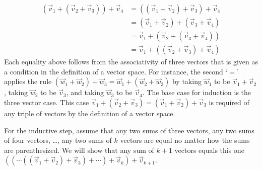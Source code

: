 \begin{exercises}
\begin{answer}
\begin{exparts}
          \begin{align*}
            (\vec{v}_1+(\vec{v}_2+\vec{v}_3))+\vec{v}_4
            &=((\vec{v}_1+\vec{v}_2)+\vec{v}_3)+\vec{v}_4  \\
            &=(\vec{v}_1+\vec{v}_2)+(\vec{v}_3+\vec{v}_4)  \\
            &=\vec{v}_1+(\vec{v}_2+(\vec{v}_3+\vec{v}_4))  \\
            &=\vec{v}_1+((\vec{v}_2+\vec{v}_3)+\vec{v}_4)
          \end{align*}
          Each equality above follows from the associativity of three vectors
          that is given as a condition in the definition of a vector space.
          For instance, the second `$=$' applies the rule
          $(\vec{w}_1+\vec{w}_2)+\vec{w}_3=\vec{w}_1+(\vec{w}_2+\vec{w}_3)$
          by taking $\vec{w}_1$ to be $\vec{v}_1+\vec{v}_2$, 
          taking $\vec{w}_2$ to be $\vec{v}_3$, 
          and taking $\vec{w}_3$ to be $\vec{v}_4$. 
        \partsitem The base case for induction is the three vector case.
          This case
          \( \vec{v}_1+(\vec{v}_2+\vec{v}_3)
          =(\vec{v}_1+\vec{v}_2)+\vec{v}_3 \) is required of any triple of
          vectors by the definition of a vector space.

          For the inductive step, assume that any two sums of three vectors,
          any two sums of four vectors,
          \ldots, any two sums of $k$ vectors 
          are equal no matter how the sums are parenthesized.
          We will show that any sum of \( k+1 \) vectors equals this one
          \( ((\cdots((\vec{v}_1+\vec{v}_2)+\vec{v}_3)+\cdots)+\vec{v}_k)
              +\vec{v}_{k+1} \).


\end{exparts}
\end{answer}
\end{exercises}
